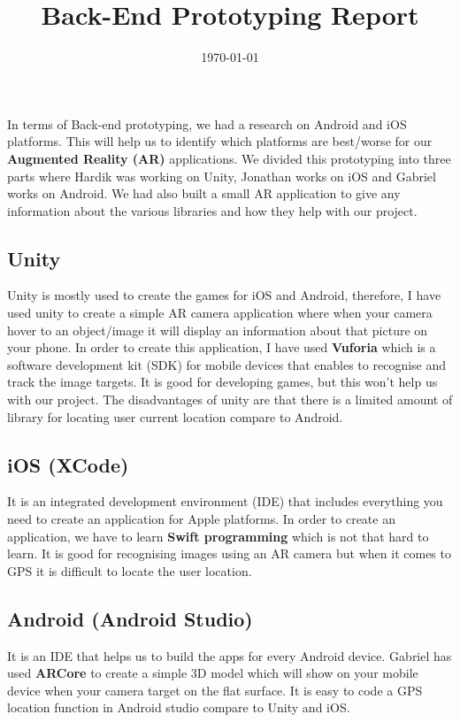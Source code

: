 \documentclass[back-end prototyping]{article}
\title {Back-End Prototyping Report}
\date{\today}
\begin{document}
\maketitle

In terms of Back-end prototyping, we had a research on Android and iOS platforms. This will help us to identify which platforms are best/worse for our \textbf {Augmented Reality (AR)} applications. We divided this prototyping into three parts where Hardik was working on Unity, Jonathan works on iOS and Gabriel works on Android. We had also built a small AR application to give any information about the various libraries and how they help with our project.

\subsection{Unity}
Unity is mostly used to create the games for iOS and Android, therefore, I have used unity to create a simple AR camera application where when your camera hover to an object/image it will display an information about that picture on your phone. In order to create this application, I have used \textbf {Vuforia} which is a software development kit (SDK) for mobile devices that enables to recognise and track the image targets. It is good for developing games, but this won’t help us with our project. The disadvantages of unity are that there is a limited amount of library for locating user current location compare to Android.

\subsection{iOS (XCode)}
It is an integrated development environment (IDE) that includes everything you need to create an application for Apple platforms. In order to create an application, we have to learn \textbf {Swift programming} which is not that hard to learn. It is good for recognising images using an AR camera but when it comes to GPS it is difficult to locate the user location.

\subsection{Android (Android Studio)}
It is an IDE that helps us to build the apps for every Android device. Gabriel has used \textbf {ARCore} to create a simple 3D model which will show on your mobile device when your camera target on the flat surface. It is easy to code a GPS location function in Android studio compare to Unity and iOS.
\end{document}
